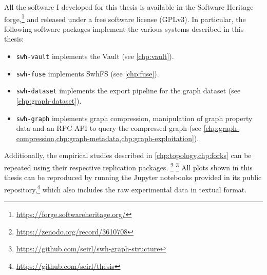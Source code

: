 All the software I developed for this thesis is available in the Software
Heritage forge,\footnote{\url{https://forge.softwareheritage.org/}} and
released under a free software license (GPLv3).
In particular, the following software packages implement the various systems
described in this thesis:

\begin{itemize}
    \setlength\itemsep{0em}
    \item \texttt{swh-vault} implements the Vault (see \cref{chp:vault}).
    \item \texttt{swh-fuse} implements SwhFS (see \cref{chp:fuse}).
    \item \texttt{swh-dataset} implements the export pipeline for the graph
        dataset (see \cref{chp:graph-dataset}).
    \item \texttt{swh-graph} implements graph compression, manipulation of
        graph property data and an RPC API to query the compressed
        graph (see
        \cref{chp:graph-compression,chp:graph-metadata,chp:graph-exploitation}).
\end{itemize}

Additionally, the empirical studies described in \cref{chp:topology,chp:forks}
can be repeated using their respective replication
packages.%
\footnote{\url{https://zenodo.org/record/3610708}}%
\footnote{\url{https://github.com/seirl/swh-graph-structure}}
%
All plots shown in this thesis can be reproduced by running the Jupyter
notebooks provided in its public
repository,\footnote{\url{https://github.com/seirl/thesis}}
which also includes the raw experimental data in textual format.
